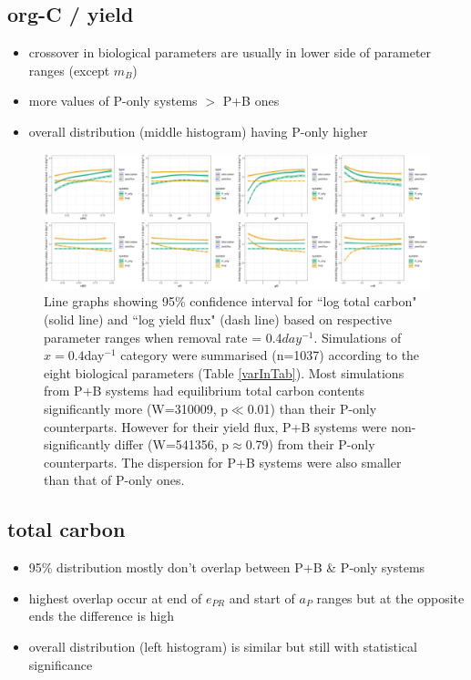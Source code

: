 \documentclass[../thesis.tex]{subfiles} %
\begin{document}
\subsection{org-C / yield}
\begin{itemize}
    \item crossover in biological parameters are usually in lower side of parameter ranges (except $m_B$)
    \item more values of P-only systems $>$ P+B ones
    \item overall distribution (middle histogram) having P-only higher
\end{itemize}

\begin{figure}[H]
    \centering
    \includegraphics[width=\linewidth]{../result/var_04.png}
    \caption[95\% distribution for $x=0.4day^{-1}$]{Line graphs showing 95\% confidence interval for ``log total carbon" (solid line) and ``log yield flux" (dash line) based on respective parameter ranges when removal rate = 0.4$day^{-1}$.  {\scriptsize Simulations of $x=0.4$day$^{-1}$ category were summarised (n=1037) according to the eight biological parameters (Table \ref{varInTab}).  Most simulations from P+B systems had equilibrium total carbon contents significantly more (W=310009, p$\ll$0.01) than their P-only counterparts.  However for their yield flux, P+B systems were non-significantly differ (W=541356, p$\approx$0.79) from their P-only counterparts.  The dispersion for P+B systems were also smaller than that of P-only ones.}}
    \label{fig:v04}
\end{figure}

\subsection{total carbon}
\begin{itemize}
    \item 95\% distribution mostly don't overlap between P+B \& P-only systems
    \item highest overlap occur at end of $e_{PR}$ and start of $a_P$ ranges but at the opposite ends the difference is high
    \item overall distribution (left histogram) is similar but still with statistical significance
\end{itemize}
\end{document}

